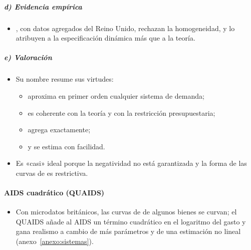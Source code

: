 \documentclass[11pt]{article}
\begin{document}
\subparagraph{d) Evidencia empírica}

\begin{itemize}
\item \textcite{DeatonMuellbauer1980AIDS}, con datos agregados del Reino Unido, rechazan la homogeneidad, y lo atribuyen a la especificación dinámica más que a la teoría.
\end{itemize}

\subparagraph{e) Valoración}

\begin{itemize}
\item Su nombre resume sus virtudes:
  \begin{itemize}
  \item aproxima en primer orden cualquier sistema de demanda;
  \item es coherente con la teoría y con la restricción presupuestaria;
  \item agrega exactamente;
  \item y se estima con facilidad.
  \end{itemize}
\item Es «casi» ideal porque la negatividad no está garantizada y la forma de las curvas de  es restrictiva.
\end{itemize}

\paragraph{AIDS cuadrático (QUAIDS)}

\begin{itemize}
\item Con microdatos británicos, las curvas de  de algunos bienes se curvan; el QUAIDS\nocite{BanksBlundellLewbel1997Quadratic} añade al AIDS un término cuadrático en el logaritmo del gasto y gana realismo a cambio de más parámetros y de una estimación no lineal (anexo~\ref{anexo:sistemas}).
\end{itemize}
\end{document}
